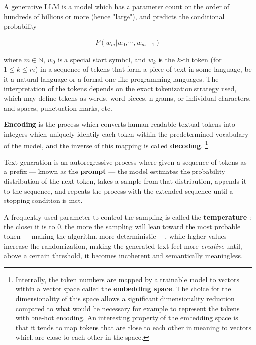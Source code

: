 \documentclass[UTF8,noindent,nohyp,parspace,titlepage,a4paper,12pt]{article}
\begin{document}
      A generative LLM is a model which has a parameter count on the order of
      hundreds of billions or more (hence "large"), and predicts the conditional
      probability \cite{llms}

      \begin{align} \label{eqautoreg}
        P(w_m | w_0, \cdots, w_{m-1})
      \end{align}

      where $m \in \mathbb{N}$, $w_0$ is a special start symbol, and $w_k$ is
      the $k$-th token (for $1 \le k \le m$) in a sequence of tokens that form
      a piece of text in some language, be it a natural language or a formal
      one like programming languages. The interpretation of the tokens depends
      on the exact tokenization strategy used, which may define tokens as
      words, word pieces, n-grams, or individual characters, and spaces,
      punctuation marks, etc.

      \textbf{Encoding} is the process which converts human-readable textual
      tokens into integers which uniquely identify each token within the
      predetermined vocabulary of the model, and the inverse of this mapping
      is called \textbf{decoding}. \footnote{Internally, the token numbers are
      mapped by a trainable model to vectors within a vector space called the
      \textbf{embedding space}. The choice for the dimensionality of this space
      allows a significant dimensionality reduction compared to what would be
      necessary for example to represent the tokens with one-hot encoding. An
      interesting property of the embedding space is that it tends to map
      tokens that are close to each other in meaning to vectors which are close
      to each other in the space.}

      Text generation is an autoregressive process where given a
      sequence of tokens as a prefix --- known as the \textbf{prompt} --- the
      model estimates the probability distribution of the next token, takes a
      sample from that distribution, appends it to the sequence, and repeats
      the process with the extended sequence until a stopping condition is met.

      A frequently used parameter to control the sampling is called the
      \textbf{temperature} \cite{temperature}: the closer it is to 0, the more
      the sampling will lean toward the most probable token --- making the
      algorithm more deterministic ---, while higher values increase the
      randomization, making the generated text feel more \emph{creative} until,
      above a certain threshold, it becomes incoherent and semantically
      meaningless.
\end{document}
